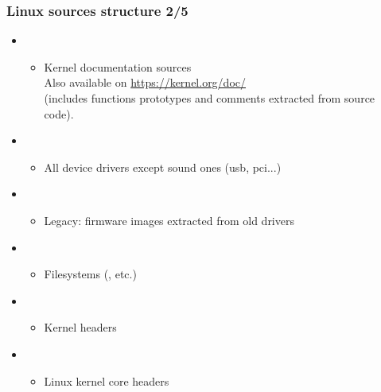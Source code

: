 \begin{frame}
  \frametitle{Linux sources structure 2/5}
  \begin{itemize}
  \item {}
    \begin{itemize}
    \item Kernel documentation sources\\
     Also available on \url{https://kernel.org/doc/}\\
     (includes functions prototypes and comments
     extracted from source code). 
    \end{itemize}
  \item {}
    \begin{itemize}
    \item All device drivers except sound ones (usb, pci...)
    \end{itemize}
  \item {}
    \begin{itemize}
    \item Legacy: firmware images extracted from old drivers
    \end{itemize}
  \item {}
    \begin{itemize}
    \item Filesystems (, etc.)
    \end{itemize}
  \item {}
    \begin{itemize}
    \item Kernel headers
    \end{itemize}
  \item {}
    \begin{itemize}
    \item Linux kernel core headers
    \end{itemize}
  \end{itemize}
\end{frame}

